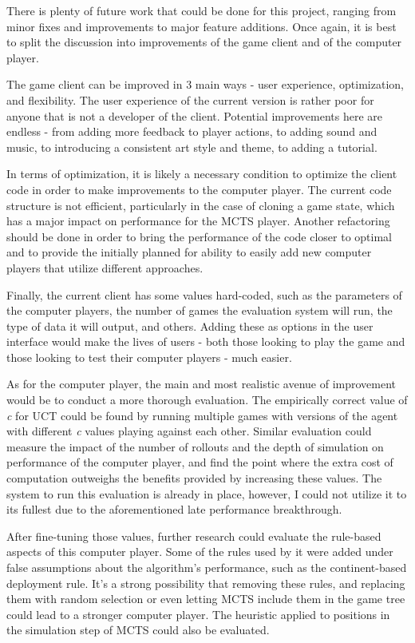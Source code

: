 There is plenty of future work that could be done for this project, ranging from minor fixes and improvements to major feature additions. Once again, it is best to split the discussion into improvements of the game client and of the computer player.

The game client can be improved in 3 main ways - user experience, optimization, and flexibility. The user experience of the current version is rather poor for anyone that is not a developer of the client. Potential improvements here are endless - from adding more feedback to player actions, to adding sound and music, to introducing a consistent art style and theme, to adding a tutorial.

In terms of optimization, it is likely a necessary condition to optimize the client code in order to make improvements to the computer player. The current code structure is not efficient, particularly in the case of cloning a game state, which has a major impact on performance for the MCTS player. Another refactoring should be done in order to bring the performance of the code closer to optimal and to provide the initially planned for ability to easily add new computer players that utilize different approaches.

Finally, the current client has some values hard-coded, such as the parameters of the computer players, the number of games the evaluation system will run, the type of data it will output, and others. Adding these as options in the user interface would make the lives of users - both those looking to play the game and those looking to test their computer players - much easier.

As for the computer player, the main and most realistic avenue of improvement would be to conduct a more thorough evaluation. The empirically correct value of \textit{c} for UCT could be found by running multiple games with versions of the agent with different \textit{c} values playing against each other. Similar evaluation could measure the impact of the number of rollouts and the depth of simulation on performance of the computer player, and find the point where the extra cost of computation outweighs the benefits provided by increasing these values. The system to run this evaluation is already in place, however, I could not utilize it to its fullest due to the aforementioned late performance breakthrough.

After fine-tuning those values, further research could evaluate the rule-based aspects of this computer player. Some of the rules used by it were added under false assumptions about the algorithm's performance, such as the continent-based deployment rule. It's a strong possibility that removing these rules, and replacing them with random selection or even letting MCTS include them in the game tree could lead to a stronger computer player. The heuristic applied to positions in the simulation step of MCTS could also be evaluated.

